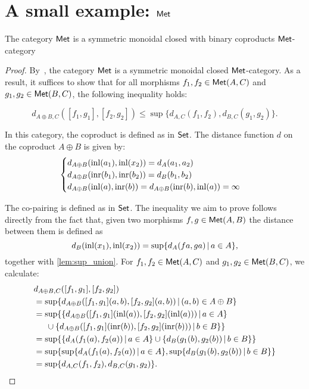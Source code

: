 \section{A small example: $\mathsf{Met}$}

\begin{proposition}
        \label{prop:vcat}
        The category $\mathsf{Met}$ is a symmetric monoidal closed with binary coproducts $\mathsf{Met}$-category 
\end{proposition}

\begin{proof}
  By~\cite[Example 3.8]{dahlqvist2022syntactic}, the category $\mathsf{Met}$ is a symmetric monoidal closed $\mathsf{Met}$-category. As a result, it suffices to show that for all morphisms \( f_1, f_2 \in \mathsf{Met}(A, C) \) and \( g_1, g_2 \in \mathsf{Met}(B, C) \), the following inequality holds:
  
\[
  d_{A \oplus B, C}([f_1, g_1], [f_2, g_2]) \leq \sup \{d_{A,C}(f_1, f_2), d_{B,C}(g_1, g_2)\}.
\]

In this category, the coproduct is defined as in $\mathsf{Set}$. The distance function $d$ on the coproduct $A \oplus B$ is given by:
   \[
    \begin{cases}
    d_{A \oplus B}(\mathrm{inl}(a_1),\mathrm{inl}(x_2)) = d_A(a_1,a_2) \\
    d_{A \oplus B}(\mathrm{inr}(b_1),\mathrm{inr}(b_2)) = d_B(b_1,b_2) \\
    d_{A \oplus B}(\mathrm{inl}(a), \mathrm{inr}(b)) = 
    d_{A \oplus B}(\mathrm{inr}(b), \mathrm{inl}(a))  = \infty
    \end{cases}
    \]

    The co-pairing is defined as in $\mathsf{Set}$. The inequality we aim to prove follows directly from the fact that, given two morphisms  $f,g\in \mathsf{Met}(A, B)$ the distance between them is defined as 
  $$ d_{B}(\mathrm{inl}(x_1),\mathrm{inl}(x_2)) = \sup \{ d_A (f a, g a) \,\vert \, a \in A \} ,$$  
    together with \autoref{lem:sup_union}. For  \( f_1, f_2 \in \mathsf{Met}(A, C) \) and \( g_1, g_2 \in \mathsf{Met}(B, C) \), we calculate:
    \begin{align*}
      & d_{A \oplus B, C}([f_1, g_1], [f_2, g_2]) \\
      &  =  \sup \{ d_{A\oplus B} ([f_1, g_1] (a,b), [f_2, g_2] (a,b)) \,\vert \, (a,b) \in A \oplus B \} \\
      & =  \sup \{ \{ d_{A\oplus B} ([f_1, g_1] (\mathrm{inl}(a)), [f_2, g_2] (\mathrm{inl}(a))) \,\vert \, a \in A \}    \\
      & \hspace{15pt} \cup \{d_{A\oplus B} ([f_1, g_1] (\mathrm{inr}(b)), [f_2, g_2] (\mathrm{inr}(b))) \,\vert \, b \in B\}\} \\
      & = \sup \{ \{ d_{A}(f_1 (a), f_2 (a)) \,\vert \, a \in A \} \cup  \{d_{B}(g_1 (b), g_2 (b)) \,\vert \, b \in B \}\} \\
      & = \sup   \{ \sup \{ d_{A}(f_1 (a), f_2 (a)) \,\vert \, a \in A \}, \sup\{d_{B}(g_1 (b), g_2 (b)) \,\vert \, b \in B \}\} \\
      &=  \sup \{d_{A,C}(f_1, f_2), d_{B,C}(g_1, g_2)\}. 
    \end{align*}
\end{proof}





